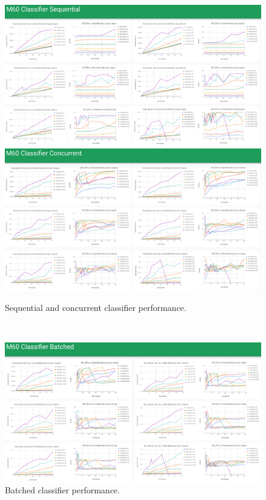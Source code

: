 \documentclass[sigconf]{acmart}
\begin{document}
\newpage~\newpage
\begin{figure}[htb]
  \centering
  \includegraphics[width=\textwidth]{img/m60-seq-class}
  \includegraphics[width=\textwidth]{img/m60-conc-class}
  \caption{Sequential and concurrent classifier performance.}
\end{figure}

\newpage~\newpage
\begin{figure}[htb]
  \centering
  \includegraphics[width=\textwidth]{img/m60-batch-class}
  \caption{Batched classifier performance.}
\end{figure}
\end{document}
